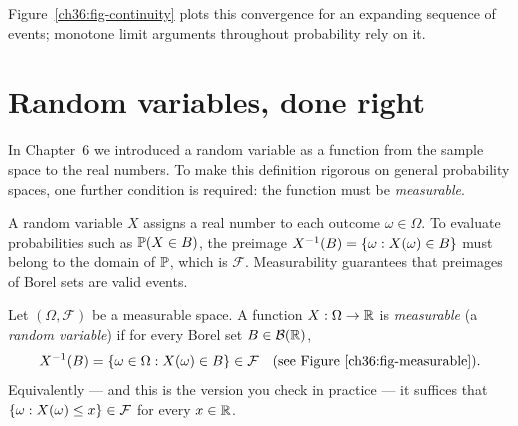 Figure~\ref{ch36:fig-continuity} plots this convergence for an expanding sequence of events;
monotone limit arguments throughout probability rely on it.

\section{Random variables, done right}
\label{ch36:random-variables}

In Chapter~6 we introduced a random variable as a function from the sample space to
the real numbers. To make this definition rigorous on general probability spaces, one
further condition is required: the function must be \emph{measurable}.

\begin{intuitionbox}
A random variable $X$ assigns a real number to each outcome $\omega \in \Omega$.
To evaluate probabilities such as $\P(X \in B)$, the preimage
$X^{-1}(B) = \set{\omega : X(\omega) \in B}$ must belong to the domain of $\P$,
which is $\mathcal{F}$. Measurability guarantees that preimages of Borel sets are
valid events.
\end{intuitionbox}

\begin{definition}
\label{ch36:rv-def}
Let $(\Omega, \mathcal{F})$ be a measurable space. A function $X : \Omega \to \R$
is \emph{measurable} (a \emph{random variable}) if for every Borel set
$B \in \mathcal{B}(\R)$,
\[
  X^{-1}(B) = \set{\omega \in \Omega : X(\omega) \in B} \in \mathcal{F} \quad \text{(see Figure~\ref{ch36:fig-measurable})}.
\]
Equivalently --- and this is the version you check in practice --- it suffices that
$\set{\omega : X(\omega) \le x} \in \mathcal{F}$ for every $x \in \R$.
\end{definition}

